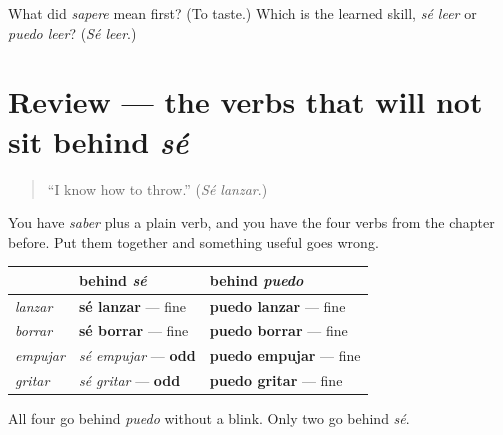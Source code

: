 \begin{tcolorbox}[breakable,colback=teal!4,colframe=teal!35!black,title={Before you move on}]
What did \emph{sapere} mean first? (To taste.) Which is the learned skill, \emph{sé leer} or \emph{puedo leer}? (\emph{Sé leer}.)
\end{tcolorbox}
\section[(review)]{Review — the verbs that will not sit behind \emph{sé}}

\label{lesson:ES-C389-repaso-se-y-puedo}



\begin{quote}
\textquotedblleft{}I know how to throw.\textquotedblright{} (\emph{Sé lanzar}.)
\end{quote}

\begin{grammarlens}[title={What you've built}]
You have \emph{saber} plus a plain verb, and you have the four verbs from the chapter before. Put them together and something useful goes wrong.

\noindent
\begin{tabularx}{\linewidth}{@{}>{\raggedright\arraybackslash}X>{\raggedright\arraybackslash}X>{\raggedright\arraybackslash}X@{}}
\toprule
\textbf{} & \textbf{behind \emph{sé}} & \textbf{behind \emph{puedo}} \\
\midrule
\emph{lanzar} & \textbf{sé lanzar} — fine & \textbf{puedo lanzar} — fine \\
\emph{borrar} & \textbf{sé borrar} — fine & \textbf{puedo borrar} — fine \\
\emph{empujar} & \emph{sé empujar} — \textbf{odd} & \textbf{puedo empujar} — fine \\
\emph{gritar} & \emph{sé gritar} — \textbf{odd} & \textbf{puedo gritar} — fine \\
\bottomrule
\end{tabularx}

All four go behind \emph{puedo} without a blink. Only two go behind \emph{sé}.
\end{grammarlens}


